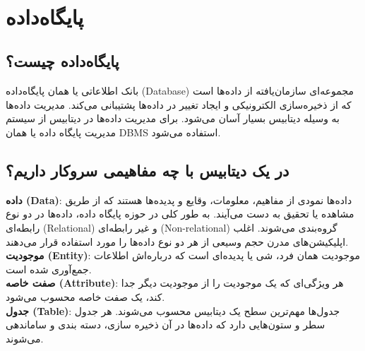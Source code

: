 \documentclass[]{article}
\begin{document}
\KashidaOff



\tableofcontents

\newpage

 \Large \textbf{\\
}



\section*{{\titr پایگاه‌داده}}
\subsection*{{\titr پایگاه‌داده چیست؟}}
بانک اطلاعاتی یا همان پایگاه‌داده (Database) مجموعه‌ای سازمان‌یافته از داده‌ها است که از ذخیره‌سازی الکترونیکی و ایجاد تغییر در داده‌ها پشتیبانی می‌کند. مدیریت داده‌ها به وسیله دیتابیس بسیار آسان می‌شود. برای مدیریت داده‌ها در دیتابیس از سیستم مدیریت پایگاه داده   یا همان DBMS استفاده می‌شود.
\subsection*{{\titr در یک دیتابیس با چه مفاهیمی سروکار داریم؟}}
\textbf{داده (Data)}: داده‌ها نمودی از مفاهیم، معلومات، وقایع و پدیده‌ها هستند که از طریق مشاهده یا تحقیق به دست می‌آیند. به طور کلی در حوزه پایگاه داده، داده‌ها در دو نوع رابطه‌ای (Relational) و غیر رابطه‌ای (Non-relational) گروه‌بندی می‌شوند. اغلب اپلیکیشن‌های مدرن حجم وسیعی از هر دو نوع داده‌ها را مورد استفاده قرار می‌دهند.\\
\textbf{موجودیت (Entity)}: موجودیت همان فرد، شی یا پدیده‌ای است که درباره‌اش اطلاعات جمع‌آوری شده است.\\
\textbf{صفت خاصه (Attribute)}: هر ویژگی‌ای که یک موجودیت را از موجودیت دیگر جدا کند، یک صفت خاصه محسوب می‌شود.\\
\textbf{جدول (Table)}: جدول‌ها مهم‌ترین سطح یک دیتابیس محسوب می‌شوند. هر جدول سطر و ستون‌هایی دارد که داده‌ها در آن ذخیره سازی، دسته بندی و ساماندهی می‌شوند.
\end{document}
